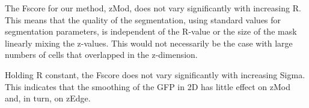 The Fscore for our method, zMod, does not vary significantly with increasing R. This means that the quality of the segmentation, using standard values for segmentation parameters, is independent of the R-value or the size of the mask linearly mixing the z-values. This would not necessarily be the case with large numbers of cells that overlapped in the z-dimension.


Holding R constant, the Fscore does not vary significantly with increasing Sigma. This indicates that the smoothing of the GFP in 2D has little effect on zMod and, in turn, on zEdge.
